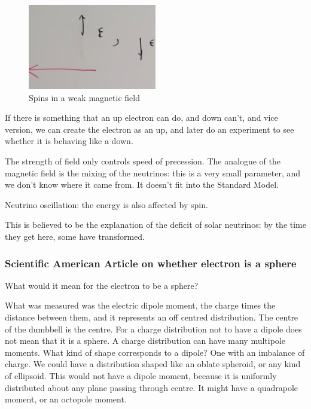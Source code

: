\documentclass[]{article}
\begin{document}
\begin{figure}[H]
	\begin{center}
		\caption{Spins in a weak magnetic field}\label{fig:aqm-8-spins-lr}
		\includegraphics[width=0.5\textwidth]{aqm-8-spins-lr}
	\end{center}
\end{figure}

If there is something that an up electron can do, and down can't, and vice version, we can create the electron as an up, and later do an experiment to see whether it is behaving like a down.

The strength of field only controls speed of precession. The analogue of the magnetic field is the mixing of the neutrinos: this is a very small parameter, and we don't know where it came from. It doesn't fit into the Standard Model.

Neutrino oscillation: the energy is also affected by spin.

This is believed to be the explanation of the deficit of solar neutrinos: by the time they get here, some have transformed.

\subsubsection{Scientific American Article on whether electron is a sphere}

What would it mean for the electron to be a sphere?

What was measured was the electric dipole moment, the charge times the distance between them, and it represents an off centred distribution. The centre of the dumbbell is the centre. For a charge distribution not to have a dipole does not mean that it is a sphere. A charge distribution can have many multipole moments. What kind of shape corresponds to a dipole? One with an imbalance of charge. We could have a distribution shaped like an oblate spheroid, or any kind of ellipsoid. This would not have a dipole moment, because it is uniformly distributed about any plane passing through centre. It might have a quadrapole moment, or an octopole moment.
\end{document}
